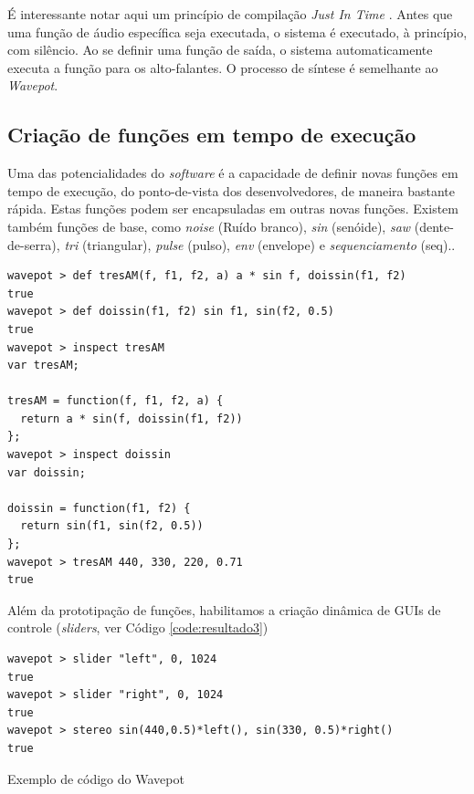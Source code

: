 É interessante notar aqui um princípio de compilação \emph{Just In Time} \cite{aycock_brief_2003}. Antes que uma função de áudio específica seja executada, o sistema é executado, à princípio, com silêncio. Ao se definir uma função de saída, o sistema automaticamente executa a função para os alto-falantes. O processo de síntese é semelhante ao \emph{Wavepot}. 

\subsection{Criação de funções em tempo de execução}

Uma das potencialidades do \emph{software} é a capacidade de definir novas funções em tempo de execução, do ponto-de-vista dos desenvolvedores, de maneira bastante rápida. Estas funções podem ser encapsuladas em outras novas funções. Existem também funções de base, como \emph{noise} (Ruído branco), \emph{sin} (senóide), \emph{saw} (dente-de-serra), \emph{tri} (triangular), \emph{pulse} (pulso), \emph{env} (envelope) e \emph{sequenciamento} (seq).. 

\begin{listing}
\begin{verbatim}
wavepot > def tresAM(f, f1, f2, a) a * sin f, doissin(f1, f2)
true
wavepot > def doissin(f1, f2) sin f1, sin(f2, 0.5)
true
wavepot > inspect tresAM
var tresAM;

tresAM = function(f, f1, f2, a) {
  return a * sin(f, doissin(f1, f2))
};
wavepot > inspect doissin
var doissin;

doissin = function(f1, f2) {
  return sin(f1, sin(f2, 0.5))
};
wavepot > tresAM 440, 330, 220, 0.71
true
\end{verbatim}
\label{code:resultado2}
\end{listing}

Além da prototipação de funções, habilitamos a criação dinâmica de GUIs de controle (\emph{sliders}, ver Código \ref{code:resultado3})

\begin{listing}
\begin{verbatim}
wavepot > slider "left", 0, 1024
true
wavepot > slider "right", 0, 1024
true
wavepot > stereo sin(440,0.5)*left(), sin(330, 0.5)*right()
true
\end{verbatim}
\caption{Exemplo de código do Wavepot}
\label{code:resultado3}
\end{listing}


